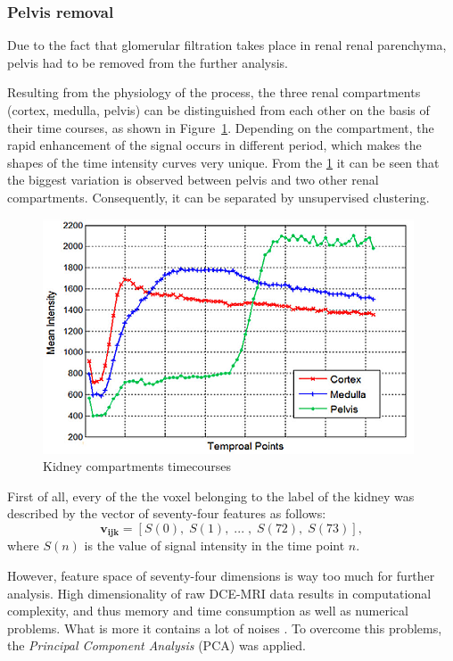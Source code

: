 \subsubsection{Pelvis removal}
Due to the fact that glomerular filtration takes place in renal renal parenchyma, pelvis had to be removed from the further analysis. 

Resulting from the physiology of the process, the three renal compartments (cortex, medulla, pelvis) can be distinguished from each other on the basis of their time courses, as shown in Figure~\ref{fig:timecourses}. Depending on the compartment, the rapid enhancement of the signal occurs in different period, which makes the shapes of the time intensity curves very unique.
From the \ref{fig:timecourses} it can be seen that the biggest variation is observed between pelvis and two other renal compartments.
Consequently, it can be separated by unsupervised clustering.
\vspace{0.5cm}

\begin{figure}[H]
	\centering
	\includegraphics[width=11cm]{img/timecourses}
	\caption[Kidney compartments timecourses]{Kidney compartments timecourses \cite{KidneySubsegmentation}}
	\label{fig:timecourses}
\end{figure}

First of all, every of the the voxel belonging to the label of the kidney was described by the vector of seventy-four features as follows:
\begin{equation}
\label{eq:voxel}
\mathbf{v_{ijk}} = [S(0),\; S(1),\;...\;,\; S(72),\; S(73)],
\end{equation}
where $S(n)$ is the value of signal intensity in the time point $n$.

However, feature space of seventy-four dimensions is way too much for further analysis. High dimensionality of raw DCE-MRI data results in computational complexity, and thus memory and time consumption as well as numerical problems. What is more it contains a lot of noises \cite{KidneySubsegmentation}. To overcome this problems, the \textit{Principal Component Analysis} (PCA) \cite{pca} was applied.


